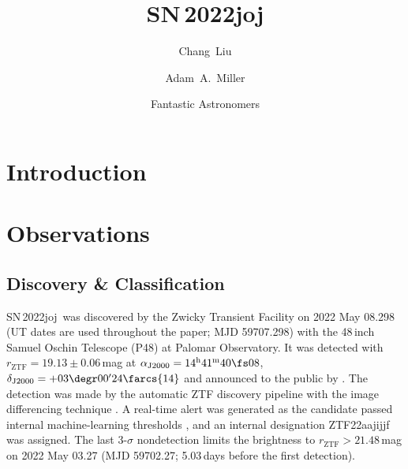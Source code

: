 \documentclass[twocolumn]{aastex631}
\newcommand{\sn}{SN\,2022joj}
\begin{document}
\begin{CJK*}{UTF8}{gbsn}

\title{SN\,2022joj}

\author[0000-0002-7866-4531]{Chang~Liu}

\author[0000-0001-9515-478X]{Adam~A.~Miller}

\author{Fantastic Astronomers}
\begin{abstract} 
%

%
\end{abstract}


\section{Introduction} \label{sec:intro}

\section{Observations} \label{sec:obs}
\subsection{Discovery \& Classification}
\sn\ was discovered by the Zwicky Transient Facility \citep[ZTF;][]{Bellm_ZTF_2019a,Graham_ZTF_2019,Dekany_ZTF_2020} on 2022 May 08.298 (UT dates are used throughout the paper; MJD 59707.298) with the 48\,inch Samuel Oschin Telescope (P48) at Palomar Observatory. It was detected with $r_\mathrm{ZTF}=19.13\pm0.06$\,mag at $\alpha_\mathrm{J2000}=14^\mathrm{h}41^\mathrm{m}40\fs08$, $\delta_\mathrm{J2000}=+03\degr00'24\farcs{14}$ and announced to the public by \citet{Fremling_2022TNSTR}. The detection was made by the automatic ZTF discovery pipeline \citep{Masci_ZTF_2019} with the image differencing technique \citep{Zackay_imagesub_2016}. A real-time alert \citep{Patterson_ZTFalert_2019} was generated as the candidate passed internal machine-learning thresholds \citep[e.g.,][]{Duev_ZTFML_2019,Mahabal_ZTFML_2019}, and an internal designation ZTF22aajijjf was assigned. The last 3-$\sigma$ nondetection limits the brightness to $r_\mathrm{ZTF}>21.48$\,mag on 2022 May 03.27 (MJD 59702.27; 5.03\,days before the first detection).


\end{CJK*}
\end{document}

